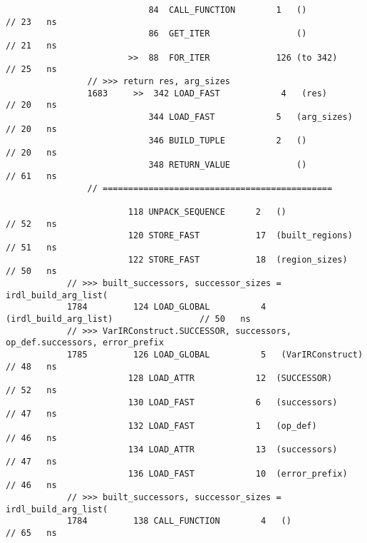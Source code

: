 \begin{code}
\begin{verbatim}
                            84  CALL_FUNCTION        1   ()                                 // 23   ns
                            86  GET_ITER                 ()                                 // 21   ns
                        >>  88  FOR_ITER             126 (to 342)                           // 25   ns
                // >>> return res, arg_sizes
                1683     >>  342 LOAD_FAST            4   (res)                             // 20   ns
                            344 LOAD_FAST            5   (arg_sizes)                        // 20   ns
                            346 BUILD_TUPLE          2   ()                                 // 20   ns
                            348 RETURN_VALUE             ()                                 // 61   ns
                // =============================================

                        118 UNPACK_SEQUENCE      2   ()                                     // 52   ns
                        120 STORE_FAST           17  (built_regions)                        // 51   ns
                        122 STORE_FAST           18  (region_sizes)                         // 50   ns
            // >>> built_successors, successor_sizes = irdl_build_arg_list(
            1784         124 LOAD_GLOBAL          4   (irdl_build_arg_list)                 // 50   ns
            // >>> VarIRConstruct.SUCCESSOR, successors, op_def.successors, error_prefix
            1785         126 LOAD_GLOBAL          5   (VarIRConstruct)                      // 48   ns
                        128 LOAD_ATTR            12  (SUCCESSOR)                            // 52   ns
                        130 LOAD_FAST            6   (successors)                           // 47   ns
                        132 LOAD_FAST            1   (op_def)                               // 46   ns
                        134 LOAD_ATTR            13  (successors)                           // 47   ns
                        136 LOAD_FAST            10  (error_prefix)                         // 46   ns
            // >>> built_successors, successor_sizes = irdl_build_arg_list(
            1784         138 CALL_FUNCTION        4   ()                                    // 65   ns


\end{verbatim}
\end{code}
